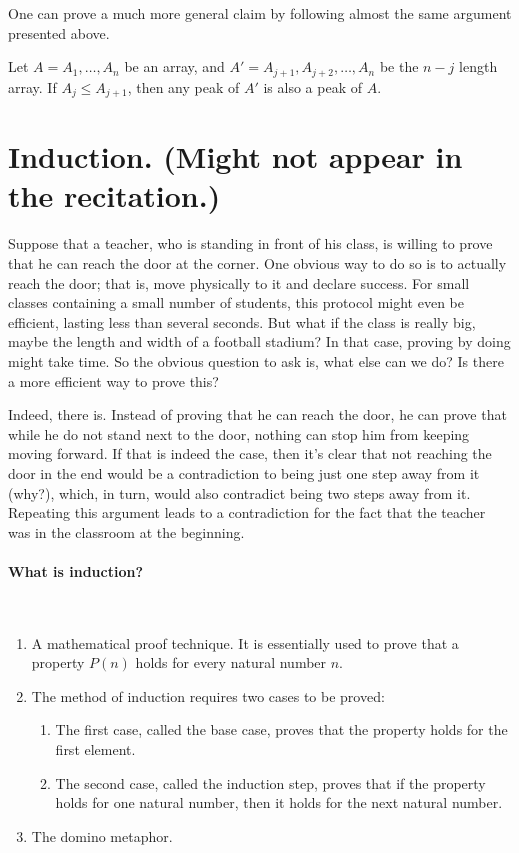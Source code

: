 One can prove a much more general claim by following almost the same argument presented above.

 \begin{claim} \label{claim:subarraymiddle} 
   Let $A = A_1, \dots, A_n$ be an array, and $A' = A_{j+1}, A_{j+2}, \dots, A_n$ be the $n-j$ length array. If $A_j \le A_{j+1}$, then any peak of $A'$ is also a peak of $A$.
\end{claim}
\section{Induction. (Might not appear in the recitation.)} 
\ifdefined\RECITATION
\else
Suppose that a teacher, who is standing in front of his class, is willing to prove that he can reach the door at the corner. One obvious way to do so is to actually reach the door; that is, move physically to it and declare success. For small classes containing a small number of students, this protocol might even be efficient, lasting less than several seconds. But what if the class is really big, maybe the length and width of a football stadium? In that case, proving by doing might take time. So the obvious question to ask is, what else can we do? Is there a more efficient way to prove this?

Indeed, there is. Instead of proving that he can reach the door, he can prove that while he do not stand next to the door, nothing can stop him from keeping moving forward. If that is indeed the case, then it's clear that not reaching the door in the end would be a contradiction to being just one step away from it (why?), which, in turn, would also contradict being two steps away from it. Repeating this argument leads to a contradiction for the fact that the teacher was in the classroom at the beginning.
\fi
\paragraph{What is induction?}~\begin{enumerate}
    \item A mathematical proof technique. It is essentially used to prove that a property \(P(n)\) holds for every natural number \(n\).
    \item The method of induction requires two cases to be proved:
    \begin{enumerate}
        \item The first case, called the base case, proves that the property holds for the first element.
        \item The second case, called the induction step, proves that if the property holds for one natural number, then it holds for the next natural number.
    \end{enumerate}
    \item The domino metaphor. 
\end{enumerate}
